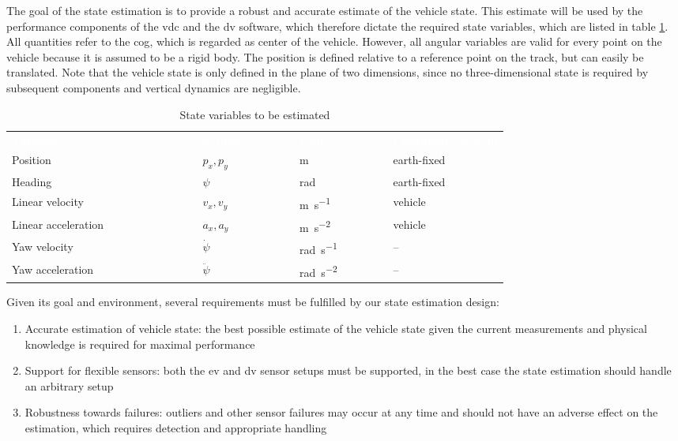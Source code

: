 The goal of the state estimation is to provide a robust and accurate estimate of the vehicle state. This estimate will be used by the performance components of the \gls{vdc} and the \gls{dv} software, which therefore dictate the required state variables, which are listed in table \ref{tab:state-variables}. All quantities refer to the \gls{cog}, which is regarded as center of the vehicle. However, all angular variables are valid for every point on the vehicle because it is assumed to be a rigid body. The position is defined relative to a reference point on the track, but can easily be translated. Note that the vehicle state is only defined in the plane of two dimensions, since no three-dimensional state is required by subsequent components and vertical dynamics are negligible.

\begin{table}
	\newcommand\heading[1]{\textcolor{white}{\textbf{\textsf{#1}}}}
	\renewcommand{\arraystretch}{1.2}
	\centering
	\begin{tabularx}{\textwidth}{l l l X}
	\rowcolor{black} \heading{Variable~~~~~~~~~~~~~~~~~~~~~} & \heading{Symbol~~~~~~~} & \heading{Unit~~~~~~~~~} & \heading{Coordinate system} \vspace{2pt} \\
	Position & $p_x, p_y$ & \si{\meter} & earth-fixed \\
	Heading & $\psi$ & \si{\radian} & earth-fixed \\
	Linear velocity & $v_x, v_y$ & \si{\meter\per\second} & vehicle \\
	Linear acceleration & $a_x, a_y$ & \si{\meter\per\square\second} & vehicle \\
	Yaw velocity & $\dot{\psi}$ & \si{\radian\per\second} & -- \\
	Yaw acceleration & $\ddot{\psi}$ & \si{\radian\per\square\second} & -- \\
	\end{tabularx}
	\caption{State variables to be estimated}
	\label{tab:state-variables}
\end{table}

Given its goal and environment, several requirements must be fulfilled by our state estimation design:
\begin{enumerate}
\item Accurate estimation of vehicle state: the best possible estimate of the vehicle state given the current measurements and physical knowledge is required for maximal performance
\item Support for flexible sensors: both the \gls{ev} and \gls{dv} sensor setups must be supported, in the best case the state estimation should handle an arbitrary setup
\item Robustness towards failures: outliers and other sensor failures may occur at any time and should not have an adverse effect on the estimation, which requires detection and appropriate handling
\end{enumerate}

